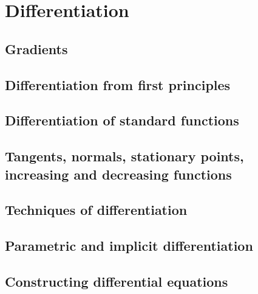 \chapter{Differentiation}
\section{Gradients}
\section{Differentiation from first principles}
\section{Differentiation of standard functions}
\section{Tangents, normals, stationary points, increasing and decreasing functions}
\section{Techniques of differentiation}
\section{Parametric and implicit differentiation}
\section{Constructing differential equations}